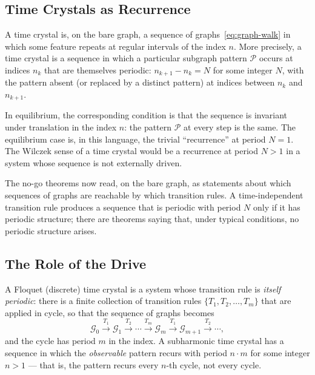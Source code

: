 \documentclass[11pt]{article}
\begin{document}
\subsection{Time Crystals as Recurrence}

A time crystal is, on the bare graph, a sequence of graphs~\eqref{eq:graph-walk} in which some feature repeats at regular intervals of the index $n$. More precisely, a time crystal is a sequence in which a particular subgraph pattern $\mathcal{P}$ occurs at indices $n_k$ that are themselves periodic: $n_{k+1} - n_k = N$ for some integer $N$, with the pattern absent (or replaced by a distinct pattern) at indices between $n_k$ and $n_{k+1}$.

In equilibrium, the corresponding condition is that the sequence is invariant under translation in the index $n$: the pattern $\mathcal{P}$ at every step is the same. The equilibrium case is, in this language, the trivial ``recurrence'' at period $N = 1$. The Wilczek sense of a time crystal would be a recurrence at period $N > 1$ in a system whose sequence is not externally driven.

The no-go theorems now read, on the bare graph, as statements about which sequences of graphs are reachable by which transition rules. A time-independent transition rule produces a sequence that is periodic with period $N$ only if it has periodic structure; there are theorems saying that, under typical conditions, no periodic structure arises.

\subsection{The Role of the Drive}

A Floquet (discrete) time crystal is a system whose transition rule is \emph{itself periodic}: there is a finite collection of transition rules $\{T_1, T_2, \ldots, T_m\}$ that are applied in cycle, so that the sequence of graphs becomes
\begin{equation}
\mathcal{G}_0 \xrightarrow{T_1} \mathcal{G}_1 \xrightarrow{T_2} \cdots \xrightarrow{T_m} \mathcal{G}_m \xrightarrow{T_1} \mathcal{G}_{m+1} \xrightarrow{T_2} \cdots,
\label{eq:driven-walk}
\end{equation}
and the cycle has period $m$ in the index. A subharmonic time crystal has a sequence in which the \emph{observable} pattern recurs with period $n \cdot m$ for some integer $n > 1$ --- that is, the pattern recurs every $n$-th cycle, not every cycle.
\end{document}
